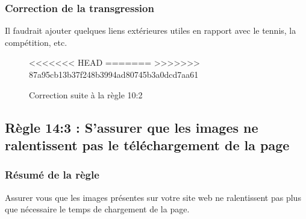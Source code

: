 \documentclass{article}[12pt]
\begin{document}
    \subsubsection*{Correction de la transgression}
    Il faudrait ajouter quelques liens extérieures utiles en rapport avec le tennis, la compétition, etc.
        \begin{figure}[H]
        	\centering
<<<<<<< HEAD
=======
>>>>>>> 87a95cb13b37f248b3994ad80745b3a0dcd7aa61
        	\caption{Correction suite à la règle 10:2}
        \end{figure}
   \newpage
    \subsection{Règle 14:3 : S'assurer que les images ne ralentissent pas le téléchargement de la page}
   \subsubsection*{Résumé de la règle}
   Assurer vous que les images présentes sur votre site web ne ralentissent pas plus que nécessaire le temps de chargement de la page.
\end{document}
